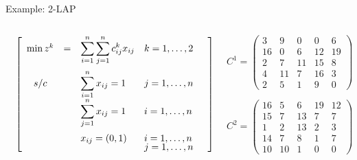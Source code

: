 \documentclass[10pt,xcolor=dvipsnames]{beamer}
\begin{document}
\begin{frame}[fragile=singleslide]{Example: 2-LAP }

\begin{columns}
%
\begin{column}{0.6\textwidth}
{\footnotesize
\hspace{0mm}
$
\quad
\left [
\begin{array}{cllllll}

  \min z^k&  =  & \displaystyle{\sum_{i=1}^{n}\sum_{j=1}^{n} c^k_{ij} x_{ij}}  &  k=1,\dots,2\vspace{2mm} \\

  s/c &\  &   \displaystyle{\sum_{i=1}^{n}  x_{ij}}   =  1 &   j=1,\dots ,n \  \ \  \\
        &  &   \displaystyle{\sum_{j=1}^{n}  x_{ij}}   =  1 &  i=1,\dots ,n \    \vspace{2mm} \\

&  &   x_{ij} = (0,1) &   i=1,\dots ,n  \vspace{-1mm}\\
&  &    &  j=1,\dots ,n\\ 
 
\end{array}
\right ]
$
}
\end{column}
%
\begin{column}{0.425\textwidth}
{\scriptsize
$
C^1 = \left(\begin{array}{ccccc}
3  & 9 &  0 &  0 &  6 \\
16 &  0  & 6 & 12 & 19 \\
2  & 7 & 11 & 15 &  8 \\
4 & 11 &  7 & 16 &  3 \\
2 &  5 &  1  & 9 &  0   
\end{array}
\right)
$
\medskip

$
C^2 = \left(\begin{array}{ccccc}
16 &  5 &  6 & 19 & 12 \\
15 &  7 & 13  & 7  & 7 \\
1 &  2 & 13 &  2 &  3 \\
14 &  7 &  8  & 1 &  7 \\
10 & 10 &  1 &  0 &  0
\end{array}
\right)
$
}
\end{column}
%
\end{columns}
\end{frame}
\end{document}
